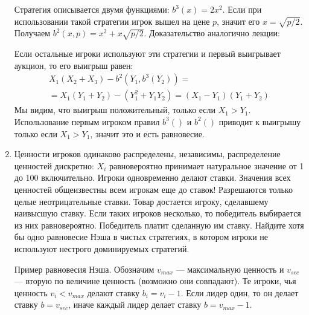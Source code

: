 \begin{enumerate}
Стратегия описывается двумя функциями: $ b^{3}(x)=2x^{2} $. Если при использовании такой стратегии игрок вышел на цене $ p $, значит его $ x=\sqrt{p/2} $. Получаем $ b^{2}(x,p)=x^{2}+x\sqrt{p/2}$. Доказательство аналогично лекции:

Если остальные игроки используют эти стратегии и первый выигрывает аукцион, то его выигрыш равен:
\begin{multline}
X_{1}(X_{2}+X_{3})-b^{2}(Y_{1},b^{3}(Y_{2}))=\\
=X_{1}(Y_{1}+Y_{2})-(Y_{1}^{2}+Y_{1}Y_{2})=(X_{1}-Y_{1})(Y_{1}+Y_{2})
\end{multline}
Мы видим, что выигрыш положительный, только если $ X_{1}>Y_{1} $. Использование первым игроком правил $ b^{3}() $ и $ b^{2}() $ приводит к выигрышу только если $ X_{1}>Y_{1} $, значит это и есть равновесие.


\item Ценности игроков одинаково распределены, независимы, распределение ценностей дискретно: $ X_{i}$ равновероятно принимает натуральное значение от 1 до 100 включительно. Игроки одновременно делают ставки. Значения всех ценностей общеизвестны всем игрокам еще до ставок! Разрешаются только целые неотрицательные ставки. Товар достается игроку, сделавшему наивысшую ставку. Если таких игроков несколько, то победитель выбирается из них равновероятно. Победитель платит сделанную им ставку. Найдите хотя бы одно равновесие Нэша в чистых стратегиях, в котором игроки не используют нестрого доминируемых стратегий. 


Пример равновесия Нэша. Обозначим $ v_{max} $ --- максимальную ценность и $ v_{sec} $ --- вторую по величине ценность (возможно они совпадают). Те игроки, чья ценность $ v_{i}<v_{max} $ делают ставку $ b_{i}=v_{i}-1 $. Если лидер один, то он делает ставку $ b=v_{sec} $, иначе каждый лидер делает ставку $ b=v_{max}-1 $.


\end{enumerate}
